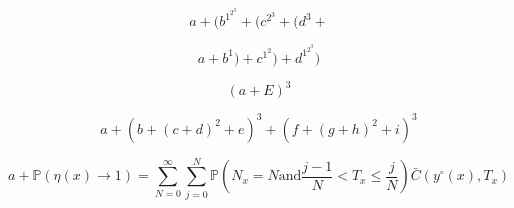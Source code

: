\documentclass{article}
\begin{document}
\[ a + (b^{1^{2^3}}  +  (c^{2^3}  + (d^3  +  \]

\[ a +  b^1) +  c^{1^2}) + d^{1^{2^3}})  \]

\[ (a  + E)^3 \]

\[ a + (b + (c+d)^2+e)^3 + (f + (g+h)^2+i)^3
\]

\[ a +
 \mathbb P(\eta(x) \to 1) = \sum_{N=0}^\infty \sum_{j=0}^N \mathbb P(N_x=N \mathrm{ and } \frac{j-1}N<T_x\leq\frac{j}N) \bar C(y^\circ(x), T_x)
\]
\end{document}
